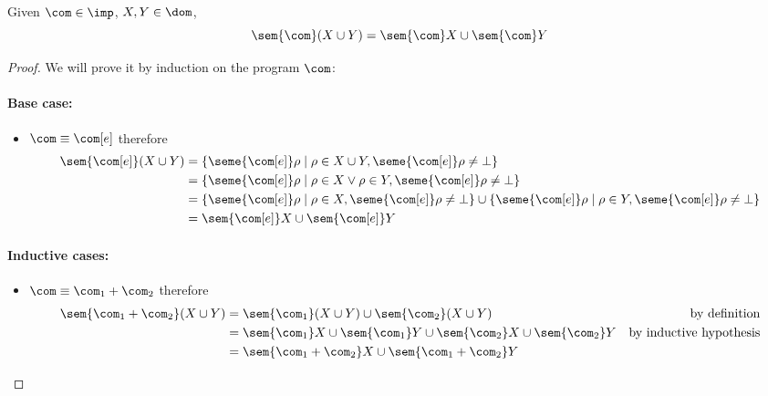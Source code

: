 \begin{observation}
  Given \(\com\in\imp\), \(X,Y \in \dom\),
  \[\sem{\com}(X\cup Y) = \sem{\com}X \cup \sem{\com}Y\]
\end{observation}

\begin{proof}
  We will prove it by induction on the program \(\com\):

  \noindent
  \paragraph*{Base case: \\}
  \begin{itemize}
  \item \(\com \equiv \com[e]\) therefore
    \begin{align*}
      \sem{\com[e]}(X\cup Y) & = \{\seme{\com[e]}\rho \mid \rho \in X \cup Y, \seme{\com[e]}\rho \neq \bot\} \\
                             & = \{\seme{\com[e]}\rho \mid \rho \in X \vee \rho \in Y, \seme{\com[e]}\rho \neq \bot\} \\
                             & = \{\seme{\com[e]}\rho \mid \rho \in X , \seme{\com[e]}\rho \neq \bot\} \cup \{\seme{\com[e]}\rho \mid \rho \in Y , \seme{\com[e]}\rho \neq \bot\} \\
                             & = \sem{\com[e]}X \cup \sem{\com[e]}Y
    \end{align*}
  \end{itemize}
  
  \noindent
  \paragraph*{Inductive cases: \\}
  \begin{itemize}
  \item \(\com \equiv \com_1 + \com_2\) therefore
    \begin{align*}
      \sem{\com_1 + \com_2}(X\cup Y) & = \sem{\com_1}(X \cup Y) \cup \sem{\com_2}(X \cup Y) & \text{by definition}\\
                           & = \sem{\com_1}X \cup \sem{\com_1}Y \cup \sem{\com_2}X \cup \sem{\com_2}Y & \text{by inductive hypothesis} \\
                           & = \sem{\com_1 + \com_2} X \cup \sem{\com_1 + \com_2} Y
    \end{align*}
    

\end{itemize}
\end{proof}
